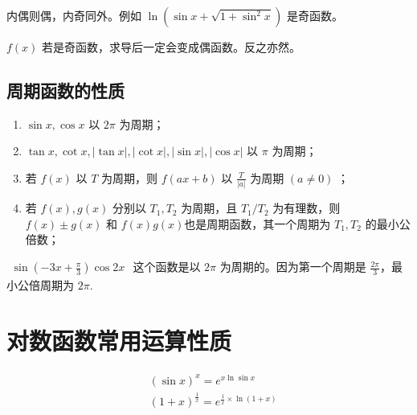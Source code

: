 \begin{theorem}[复合函数的奇偶性]
    内偶则偶，内奇同外。例如 $\ln \left(\sin x+\sqrt{1+\sin ^2 x}\right)$ 是奇函数。
\end{theorem}

\begin{theorem}[求导的奇偶性]
    $f(x)$ 若是奇函数，求导后一定会变成偶函数。反之亦然。
\end{theorem}

\subsection{周期函数的性质}

\begin{theorem}[周期函数的性质]
    \begin{enumerate}
        \item  $\sin x, \cos x$ 以 $2 \pi$ 为周期；
        \item  $\tan x, \cot x,|\tan x|,|\cot x|,|\sin x|,|\cos x|$ 以 $\pi$ 为周期；
        \item 若 $f(x)$ 以 $T$ 为周期，则 $f(a x+b)$ 以 $\frac{T}{|a|}$ 为周期 $(a \neq 0)$ ；
        \item 若 $f(x), g(x)$ 分别以 $T_1, T_2$ 为周期，且 $T_1 / T_2$ 为有理数，则 $f(x) \pm g(x)$ 和 $f(x) g(x)$也是周期函数，其一个周期为 $T_1, T_2$ 的最小公倍数；
    \end{enumerate}
\end{theorem}

\begin{example}
    $
        \begin{gathered}
            \sin \left(-3 x+\frac{\pi}{3}\right) \cos 2 x
        \end{gathered}
    $ 这个函数是以 $2\pi$ 为周期的。因为第一个周期是 $\frac{2\pi}{3}$，最小公倍周期为 $2\pi$.
\end{example}

\section{对数函数常用运算性质}

\begin{example}
    $$
        \begin{aligned}
             & (\sin x)^x=e^{x \ln \sin x}                         \\
             & (1+x)^{\frac{1}{x}}=e^{\frac{1}{x} \times \ln(1+x)}
        \end{aligned}
    $$
\end{example}

